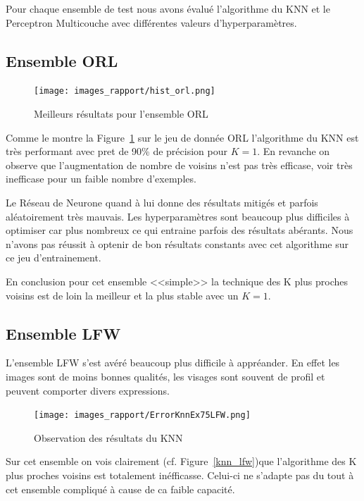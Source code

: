 \documentclass[a4paper,10pt,twocolumn]{extarticle}
\begin{document}
Pour chaque ensemble de test nous avons évalué l'algorithme du KNN et le Perceptron Multicouche avec différentes valeurs d'hyperparamètres.

\subsection{Ensemble ORL}
\begin{figure}[H]
  \begin{center}
    \texttt{[image: images\_rapport/hist\_orl.png]}
    \caption{Meilleurs résultats pour l'ensemble ORL}
    \label{fig:results_orl}
  \end{center}
\end{figure}
Comme le montre la Figure~\ref{fig:results_orl} sur le jeu de donnée ORL l'algorithme du KNN est très performant avec pret de 90\% de précision pour $K = 1$. En revanche on observe que l'augmentation de nombre de voisins n'est pas très efficase, voir très inefficase pour un faible nombre d'exemples.

Le Réseau de Neurone quand à lui donne des résultats mitigés et parfois aléatoirement très mauvais. Les hyperparamètres sont beaucoup plus difficiles à optimiser car plus nombreux ce qui entraine parfois des résultats abérants. Nous n'avons pas réussit à optenir de bon résultats constants avec cet algorithme sur ce jeu d'entrainement.

En conclusion pour cet ensemble <<simple>> la technique des K plus proches voisins est de loin la meilleur et la plus stable avec un $K = 1$.

\subsection{Ensemble LFW}
L'ensemble LFW s'est avéré beaucoup plus difficile à appréander. En effet les images sont de moins bonnes qualités, les visages sont souvent de profil et peuvent comporter divers expressions.
\begin{figure}[H]
  \begin{center}
    \texttt{[image: images\_rapport/ErrorKnnEx75LFW.png]}
    \caption{Observation des résultats du KNN}
    \label{fig:knn_lfw}
  \end{center}
\end{figure}
Sur cet ensemble on vois clairement (cf. Figure~\ref{knn_lfw})que l'algorithme des K plus proches voisins est totalement inéfficasse. Celui-ci ne s'adapte pas du tout à cet ensemble compliqué à cause de ca faible capacité.
\end{document}
